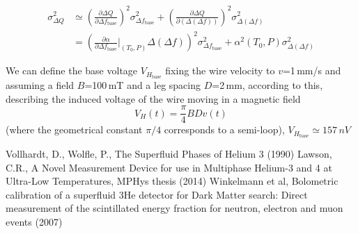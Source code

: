 \documentclass[a4paper,12pt]{article}
\begin{document}
\begin{align}
  \sigma_{\Delta Q}^2 & \simeq \left( \frac{\partial \Delta Q}{\partial \Delta f_\mathrm{base}} \right)^2 \sigma_{\Delta f_\mathrm{base}}^2 
                             + \left( \frac{\partial \Delta Q}{\partial(\Delta(\Delta f))} \right)^2 \sigma_{\Delta (\Delta f)}^2  \\
                      & = \left( \frac{\partial \alpha}{\partial \Delta f_\mathrm{base}} \biggr\rvert_{(T_0,P)} \Delta(\Delta f )\right)^2 \sigma_{\Delta f_\mathrm{base}}^2
                        + \alpha^2(T_0,P) \sigma_{\Delta (\Delta f)}^2
\end{align}


We can define the base voltage $V_{H_{\mathrm{base}}}$ fixing the wire velocity to $v$=1\,mm/s and assuming a field $B$=100\,mT and a leg spacing $D$=2\,mm, according to this, describing the induced voltage of the wire moving in a magnetic field
\begin{equation}
V_H(t) = \frac{\pi}{4} B D v(t)
\end{equation}
(where the geometrical constant $\pi/4$ corresponds to a semi-loop), $V_{H_{\mathrm{base}}} \simeq 157\,nV$ 




\pagebreak
\newpage

\begin{thebibliography}{9}

 Vollhardt, D., Wolfle, P., The Superfluid Phases of Helium 3 (1990)
 Lawson, C.R., A Novel Measurement Device for use in Multiphase Helium-3 and 4 at Ultra-Low Temperatures, MPHys thesis (2014)
 Winkelmann et al, Bolometric calibration of a superfluid 3He detector for Dark Matter search: Direct measurement of the scintillated energy fraction for
neutron, electron and muon events (2007)

\end{thebibliography}
\end{document}
